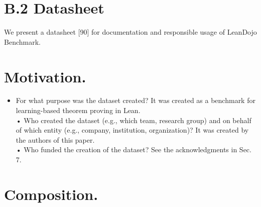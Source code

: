 \documentclass[
]{article}
\providecommand{\tightlist}{%
  \setlength{\itemsep}{0pt}\setlength{\parskip}{0pt}}
\begin{document}
\section{B.2 Datasheet}\label{b.2-datasheet}

We present a datasheet {[}90{]} for documentation and responsible usage
of LeanDojo Benchmark.

\section{Motivation.}\label{motivation.}

\begin{itemize}
\tightlist
\item
  For what purpose was the dataset created? It was created as a
  benchmark for learning-based theorem proving in Lean.\\
  • Who created the dataset (e.g., which team, research group) and on
  behalf of which entity (e.g., company, institution, organization)? It
  was created by the authors of this paper.\\
  • Who funded the creation of the dataset? See the acknowledgments in
  Sec. 7.
\end{itemize}

\section{Composition.}\label{composition.}
\end{document}
